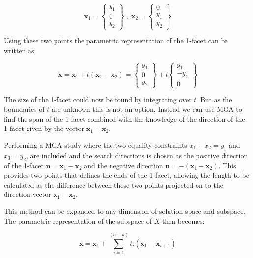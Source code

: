 \begin{equation*}
	\mathbf{x}_1 = 
	\begin{Bmatrix}
	y_1 \\
	0 \\
	y_2
	\end{Bmatrix}
	\; , \; \mathbf{x}_2 = 
	\begin{Bmatrix}
	0 \\
	y_1 \\
	y_2
	\end{Bmatrix}
\end{equation*}

Using these two points the parametric representation of the 1-facet can be written as:

\begin{equation}\label{eq:1-facet}
	\mathbf{x} = \mathbf{x}_1 + t \left(\mathbf{x}_1-\mathbf{x}_2  \right)
	=
	\begin{Bmatrix}
	y_1 \\
	0 \\
	y_2
	\end{Bmatrix}
	+t	
	\begin{Bmatrix}
	y_1 \\
	-y_1 \\
	0
	\end{Bmatrix}	
\end{equation}

The size of the 1-facet could now be found by integrating over $t$. But as the boundaries of $t$ are unknown this is not an option. Instead we can use MGA to find the span of the 1-facet combined with the knowledge of the direction of the 1-facet given by the vector $\mathbf{x}_1 - \mathbf{x}_2$. 

Performing a MGA study where the two equality constraints $ x_1 + x_2 = y_1$ and $x_3 = y_2 $, are included and the search directions is chosen as the positive direction of the 1-facet $\mathbf{n} = \mathbf{x}_1 - \mathbf{x}_2$ and the negative direction $\mathbf{n} = -(\mathbf{x}_1 - \mathbf{x}_2)$. This provides two points that defines the ends of the 1-facet, allowing the length to be calculated as the difference between these two points projected on to the direction vector $\mathbf{x}_1 - \mathbf{x}_2$.

This method can be expanded to any dimension of solution space and subspace. The parametric representation of the subspace of $X$ then becomes:

\begin{equation}
	\mathbf{x} = \mathbf{x}_1 + \sum_{i=1}^{(n-k)} t_i (\mathbf{x}_1-\mathbf{x}_{i+1})
\end{equation}

